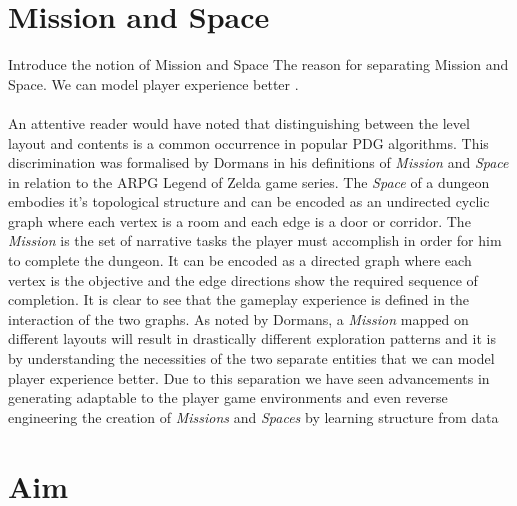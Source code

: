 \documentclass{UoYCSproject}
\begin{document}
\section{Mission and Space}
\begin{outline}
  \1 Introduce the notion of Mission and Space
  \1 The reason for separating Mission and Space. We can model player experience better \parencite{DormansMS,SummervilleLearningOfZelda}.
\end{outline}

\paragraph{} %
An attentive reader would have noted that distinguishing between the level layout and contents is a common occurrence in popular PDG algorithms. This discrimination was formalised by Dormans\parencite{DormansMS} in his definitions of \textit{Mission} and \textit{Space} in relation to the ARPG Legend of Zelda game series.
The \textit{Space} of a dungeon embodies it's topological structure and can be encoded as an undirected cyclic graph where each vertex is a room and each edge is a door or corridor. The \textit{Mission} is the set of narrative tasks the player must accomplish in order for him to complete the dungeon. It can be encoded as a directed graph where each vertex is the objective and the edge directions show the required sequence of completion. It is clear to see that the gameplay experience is defined in the interaction of the two graphs. As noted by Dormans, a \textit{Mission} mapped on different layouts will result in drastically different exploration patterns and it is by understanding the necessities of the two separate entities that we can model player experience better. Due to this separation we have seen advancements in generating adaptable to the player game environments \parencite{DormansAE} and even reverse engineering the creation of \textit{Missions} and \textit{Spaces} by learning structure from data \parencite{SummervilleLearningOfZelda}

\section{Aim}
\end{document}
